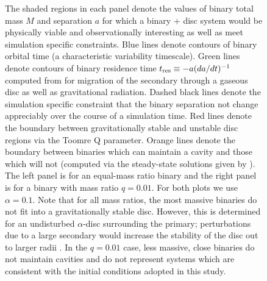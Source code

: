 \begin{figure}
\caption{The shaded regions in each panel denote the values of binary total mass $M$ and separation $a$ for which a binary + disc system would be physically viable and observationally interesting as well as meet simulation specific constraints. Blue lines denote contours of binary orbital time (a characteristic variability timescale). Green lines denote contours of binary residence time $t_{\rm{res}}\equiv -a (da/dt)^{-1}$ computed from \citealt{HKM09} for migration of the secondary through a gaseous disc as well as gravitational radiation. Dashed black lines denote the simulation specific constraint  that the binary separation not change appreciably over the course of a simulation time. Red lines denote the boundary between gravitationally stable and unstable disc regions via the Toomre Q parameter. Orange lines denote the boundary between binaries which can maintain a cavity and those which will not (computed via the steady-state solutions given by \citealt{Kocsis+2012b}). The left panel is for an equal-mass ratio binary and the right panel is for a binary with mass ratio $q=0.01$. For both plots we use $\alpha=0.1$. Note that for all mass ratios, the most massive binaries do not fit into a gravitationally stable disc. However, this is determined for an undisturbed $\alpha$-disc surrounding the primary; perturbations due to a large secondary would increase the stability of the disc out to larger radii \citep{HKM09}.
In the $q=0.01$ case, less massive, close binaries do not maintain cavities and do not represent systems which are consistent with the initial conditions adopted in this study.}
\label{ObsCBD}
\end{figure}



